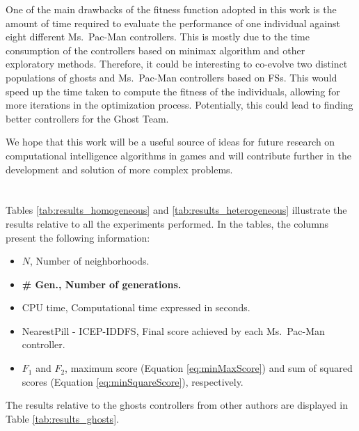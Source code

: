 \documentclass[journal]{IEEEtran}
\begin{document}
One of the main drawbacks of the fitness function adopted in this work is the amount of time required to evaluate the performance of one individual against eight different Ms.\  Pac-Man controllers. This is mostly due to the time consumption of the controllers based on minimax algorithm and other exploratory methods. Therefore, it could be interesting to co-evolve two distinct populations of ghosts and Ms.\  Pac-Man controllers based on FSs. This would speed up the time taken to compute the fitness of the individuals, allowing for more iterations in the optimization process. Potentially, this could lead to finding better controllers for the Ghost Team.

We hope that this work will be a useful source of ideas for future research on computational intelligence algorithms in games and will contribute further in the development and solution of more complex problems.

\appendices
\section{}
\label{sec:CompleteResults}
Tables \ref{tab:results_homogeneous} and \ref{tab:results_heterogeneous} illustrate the results relative to all the experiments performed. In the tables, the columns present the following information: 

\begin{itemize}
  \item $N$, Number of neighborhoods.
  \item \textbf{\# Gen., Number of generations.}
  \item CPU time, Computational time expressed in seconds.
  \item NearestPill - ICEP-IDDFS, Final score achieved by each Ms.\  Pac-Man controller.
  \item $F_1$ and $F_2$, maximum score (Equation \eqref{eq:minMaxScore}) and sum of squared scores (Equation \eqref{eq:minSquareScore}), respectively.
\end{itemize}

The results relative to the ghosts controllers from other authors are displayed in Table \ref{tab:results_ghosts}.
\end{document}
